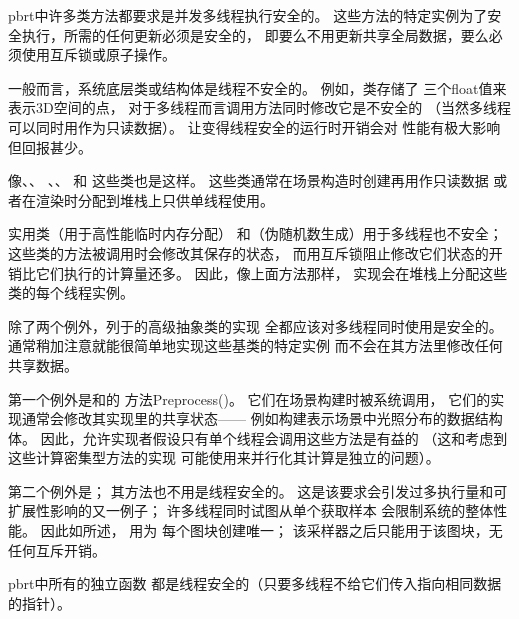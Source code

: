 pbrt中许多类方法都要求是并发多线程执行安全的。
这些方法的特定实例为了安全执行，所需的任何更新必须是安全的，
即要么不用更新共享全局数据，要么必须使用互斥锁或原子操作。

一般而言，系统底层类或结构体是线程不安全的。
例如，类存储了
三个{\ttfamily float}值来表示3D空间的点，
对于多线程而言调用方法同时修改它是不安全的
（当然多线程可以同时用作为只读数据）。
让变得线程安全的运行时开销会对
性能有极大影响但回报甚少。

像、、
、、
和
这些类也是这样。
这些类通常在场景构造时创建再用作只读数据
或者在渲染时分配到堆栈上只供单线程使用。

实用类（用于高性能临时内存分配）
和（伪随机数生成）用于多线程也不安全；
这些类的方法被调用时会修改其保存的状态，
而用互斥锁阻止修改它们状态的开销比它们执行的计算量还多。
因此，像上面方法那样，
实现会在堆栈上分配这些类的每个线程实例。

除了两个例外，列于的高级抽象类的实现
全都应该对多线程同时使用是安全的。
通常稍加注意就能很简单地实现这些基类的特定实例
而不会在其方法里修改任何共享数据。

第一个例外是和的
方法{\ttfamily Preprocess()}。
它们在场景构建时被系统调用，
它们的实现通常会修改其实现里的共享状态——
例如构建表示场景中光照分布的数据结构体。
因此，允许实现者假设只有单个线程会调用这些方法是有益的
（这和考虑到这些计算密集型方法的实现
可能使用来并行化其计算是独立的问题）。

第二个例外是；
其方法也不用是线程安全的。
这是该要求会引发过多执行量和可扩展性影响的又一例子；
许多线程同时试图从单个获取样本
会限制系统的整体性能。
因此如所述，
用为
每个图块创建唯一；
该采样器之后只能用于该图块，无任何互斥开销。

pbrt中所有的独立函数
都是线程安全的（只要多线程不给它们传入指向相同数据的指针）。